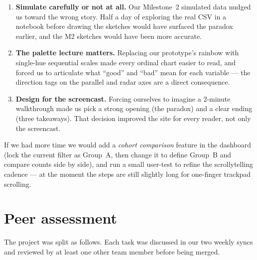 \documentclass[11pt,a4paper]{article}
\begin{document}
\begin{enumerate}
  \item \textbf{Simulate carefully or not at all.} Our Milestone~2 simulated data nudged us toward the wrong story. Half a day of exploring the real CSV in a notebook before drawing the sketches would have surfaced the paradox earlier, and the M2 sketches would have been more accurate.
  \item \textbf{The palette lecture matters.} Replacing our prototype's rainbow with single-hue sequential scales made every ordinal chart easier to read, and forced us to articulate what ``good'' and ``bad'' mean for each variable — the direction tags on the parallel and radar axes are a direct consequence.
  \item \textbf{Design for the screencast.} Forcing ourselves to imagine a 2-minute walkthrough made us pick a strong opening (the paradox) and a clear ending (three takeaways). That decision improved the site for every reader, not only the screencast.
\end{enumerate}

If we had more time we would add a \emph{cohort comparison} feature in the dashboard (lock the current filter as Group~A, then change it to define Group~B and compare counts side by side), and run a small user-test to refine the scrollytelling cadence — at the moment the steps are still slightly long for one-finger trackpad scrolling.

\section{Peer assessment}
\label{sec:peer}

The project was split as follows. Each task was discussed in our two weekly syncs and reviewed by at least one other team member before being merged.
\end{document}
